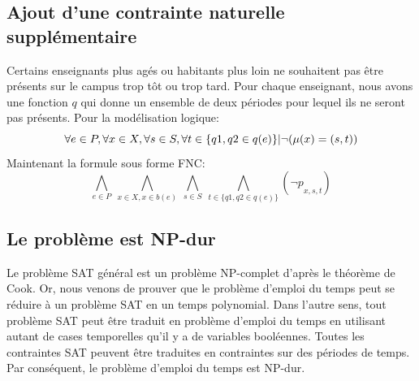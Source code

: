 \documentclass[a4paper,10pt]{article}
\begin{document}
\subsection{Ajout d'une contrainte naturelle supplémentaire}
Certains enseignants plus agés ou habitants plus loin ne souhaitent pas être
présents sur le campus trop tôt ou trop tard.
Pour chaque enseignant, nous avons une fonction $q$ qui donne un ensemble de deux périodes pour lequel
ils ne seront pas présents. 
Pour la modélisation logique:
\begin{equation}
\forall e \in P, \forall x \in X,  \forall s \in S,  \forall t \in \{q1,q2 \in q(e)\} | \neg ( \mu(x) = ( s, t )) \\
\end{equation}
Maintenant la formule sous forme FNC:
\begin{equation}
\bigwedge\limits_{e \in P}\ \bigwedge\limits_{x \in X, x \in b(e)}\ \bigwedge\limits_{s \in S}\ \bigwedge\limits_{t \in \{q1,q2 \in q(e)\}} ( \neg p\underset{x,s,t}{} )
\end{equation}
\subsection{Le problème est NP-dur}
Le problème SAT général est un problème NP-complet d'après le théorème de Cook. Or, nous venons de prouver
que le problème d'emploi du temps peut se réduire à un problème SAT en un temps polynomial. Dans l'autre sens, tout problème SAT peut être traduit en problème
d'emploi du temps en utilisant autant de cases temporelles qu'il y a de variables booléennes. Toutes les contraintes SAT peuvent être traduites en contraintes sur
des périodes de temps.
Par conséquent, le problème d'emploi du temps est NP-dur.
\end{document}
